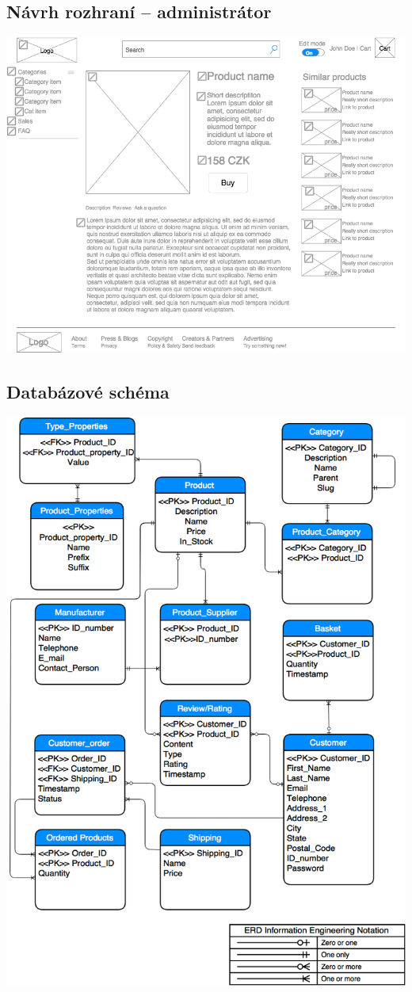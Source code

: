 \documentclass[11pt,a4paper]{article}
\begin{document}
\subsection*{Návrh rozhraní -- administrátor}
\includegraphics[scale=0.6]{pyngshop_edit.png}
\newpage

\subsection*{Databázové schéma}
\centerline{\includegraphics[scale=0.55]{eshop_erd.png}}
\newpage
\end{document}
